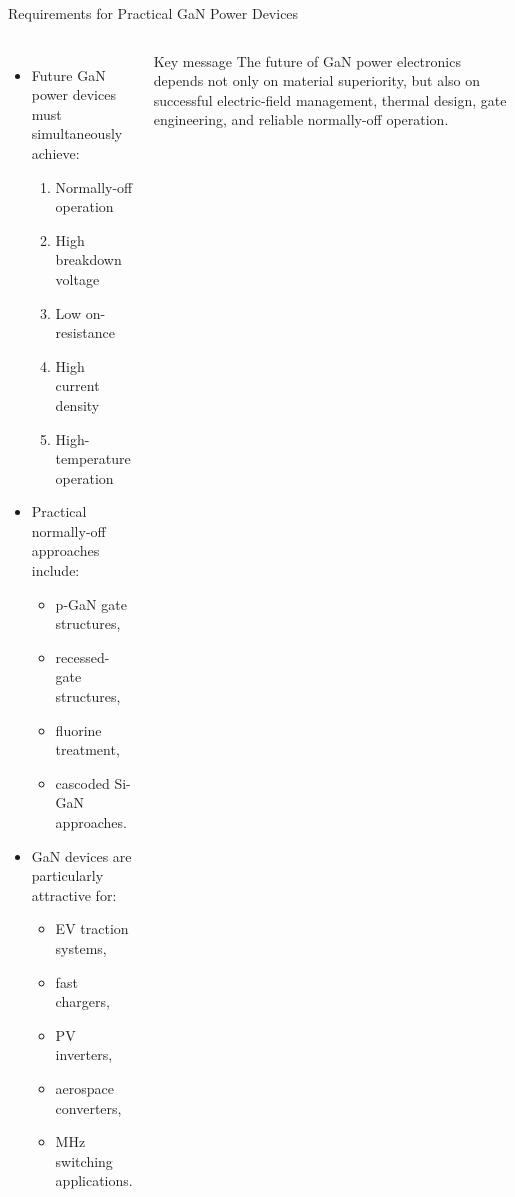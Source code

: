 \begin{frame}{Requirements for Practical GaN Power Devices}
    \begin{columns}[T]
\begin{itemize}
    \item Future GaN power devices must simultaneously achieve:
    \begin{enumerate}
        \item Normally-off operation
        \item High breakdown voltage
        \item Low on-resistance
        \item High current density
        \item High-temperature operation
    \end{enumerate}

    \item Practical normally-off approaches include:
    \begin{itemize}
        \item p-GaN gate structures,
        \item recessed-gate structures,
        \item fluorine treatment,
        \item cascoded Si-GaN approaches.
    \end{itemize}

    \item GaN devices are particularly attractive for:
    \begin{itemize}
        \item EV traction systems,
        \item fast chargers,
        \item PV inverters,
        \item aerospace converters,
        \item MHz switching applications.
    \end{itemize}
\end{itemize}

\begin{block}{Key message}
The future of GaN power electronics depends not only on material superiority, but also on successful electric-field management, thermal design, gate engineering, and reliable normally-off operation.
\end{block}
\end{columns}  
\end{frame}



